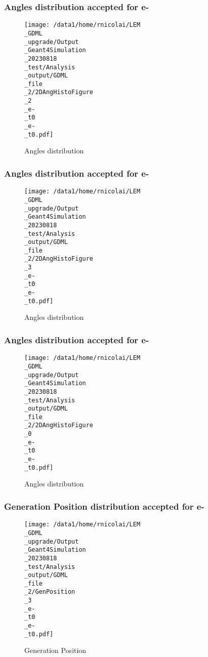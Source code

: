 \documentclass[8pt]{beamer}
\begin{document}
            \begin{frame}
                \frametitle{Angles distribution accepted for e-}
            
        \begin{figure}[h]
            \centering
            \texttt{[image: /data1/home/rnicolai/LEM\\\_GDML\\\_upgrade/Output\\\_Geant4Simulation\\\_20230818\\\_test/Analysis\\\_output/GDML\\\_file\\\_2/2DAngHistoFigure\\\_2\\\_e-\\\_t0\\\_e-\\\_t0.pdf]}
            \caption{Angles distribution}
        \end{figure}
        
            \end{frame}
            
            \begin{frame}
                \frametitle{Angles distribution accepted for e-}
            
        \begin{figure}[h]
            \centering
            \texttt{[image: /data1/home/rnicolai/LEM\\\_GDML\\\_upgrade/Output\\\_Geant4Simulation\\\_20230818\\\_test/Analysis\\\_output/GDML\\\_file\\\_2/2DAngHistoFigure\\\_3\\\_e-\\\_t0\\\_e-\\\_t0.pdf]}
            \caption{Angles distribution}
        \end{figure}
        
            \end{frame}
            
            \begin{frame}
                \frametitle{Angles distribution accepted for e-}
            
        \begin{figure}[h]
            \centering
            \texttt{[image: /data1/home/rnicolai/LEM\\\_GDML\\\_upgrade/Output\\\_Geant4Simulation\\\_20230818\\\_test/Analysis\\\_output/GDML\\\_file\\\_2/2DAngHistoFigure\\\_0\\\_e-\\\_t0\\\_e-\\\_t0.pdf]}
            \caption{Angles distribution}
        \end{figure}
        
            \end{frame}
            
            \begin{frame}
                \frametitle{Generation Position distribution accepted for e-}
            
        \begin{figure}[h]
            \centering
            \texttt{[image: /data1/home/rnicolai/LEM\\\_GDML\\\_upgrade/Output\\\_Geant4Simulation\\\_20230818\\\_test/Analysis\\\_output/GDML\\\_file\\\_2/GenPosition\\\_3\\\_e-\\\_t0\\\_e-\\\_t0.pdf]}
            \caption{Generation Position}
        \end{figure}
        
            \end{frame}
            
\end{document}
